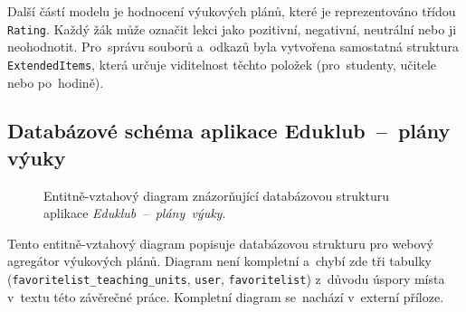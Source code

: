 \documentclass[male,czech,api_bc]{kitheses}
\begin{document}
Další částí modelu je hodnocení výukových plánů, které je reprezentováno třídou \texttt{Rating}. Každý žák může označit lekci jako pozitivní, negativní, neutrální nebo ji neohodnotit. Pro~správu souborů a~odkazů byla vytvořena samostatná struktura \texttt{ExtendedItems}, která určuje viditelnost těchto položek (pro~studenty, učitele nebo po~hodině).

\subsection{Databázové schéma aplikace Eduklub~--~plány výuky}

\begin{figure}[H]
	\centering
	\caption{Entitně-vztahový diagram znázorňující databázovou strukturu aplikace \mbox{\textit{Eduklub~--~plány výuky}.}}
	\label{fig:erd-2}
\end{figure}

Tento entitně-vztahový diagram popisuje databázovou strukturu pro webový agregátor výukových plánů. Diagram není kompletní a~chybí zde tři tabulky (\texttt{favoritelist\_teaching\_units}, \texttt{user}, \texttt{favoritelist}) z~důvodu úspory místa v~textu této závěrečné práce. Kompletní diagram se~nachází v~externí příloze.
\end{document}
